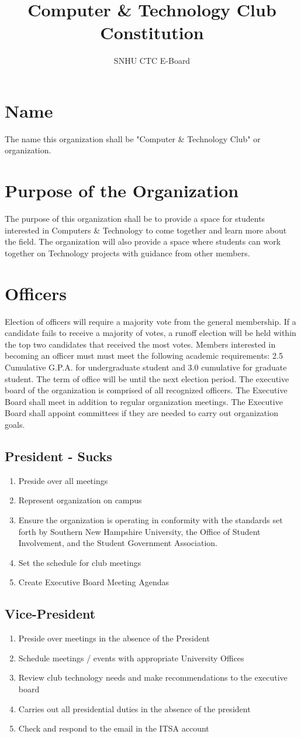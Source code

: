 \documentclass{article}
\title{Computer \& Technology Club Constitution}
\author{SNHU CTC E-Board}
\date{\datechanged}
\newcommand{\article}[1]{\section{#1} \label{#1}}
\newcommand{\asection}[1]{\subsection{#1} \label{#1}}
\begin{document}
\maketitle


\article{Name}
The name this organization shall be "Computer \& Technology Club" or organization.

\article{Purpose of the Organization}
The purpose of this organization shall be to provide a space for students interested in Computers \& Technology to come together and learn more about the field. 
The organization will also provide a space where students can work together on Technology projects with guidance from other members.

\article{Officers}
Election of officers will require a majority vote from the general membership. 
If a candidate fails to receive a majority of votes, a runoff election will be held within the top two candidates that received the most votes. 
Members interested in becoming an officer must must meet the following academic requirements: 2.5 Cumulative G.P.A. for undergraduate student and 3.0 cumulative for graduate student. 
The term of office will be until the next election period. 
The executive board of the organization is comprised of all recognized officers. 
The Executive Board shall meet in addition to regular organization meetings. 
The Executive Board shall appoint committees if they are needed to carry out organization goals.

\asection{President - Sucks}
\begin{enumerate}
\item Preside over all meetings
\item Represent organization on campus
\item Ensure the organization is operating in conformity with the standards set forth by Southern New Hampshire University, the Office of Student Involvement, and the Student Government Association.
\item Set the schedule for club meetings
\item Create Executive Board Meeting Agendas
\end{enumerate}

\asection{Vice-President}
\begin{enumerate}
\item Preside over meetings in the absence of the President
\item Schedule meetings / events with appropriate University Offices
\item Review club technology needs and make recommendations to the executive board
\item Carries out all presidential duties in the absence of the president
\item Check and respond to the email in the ITSA account
\end{enumerate}
\end{document}
